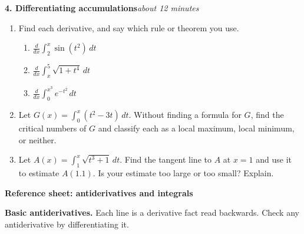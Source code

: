 \documentclass[11pt]{article}
\newcommand{\prob}[2]{\medskip\noindent\textbf{\large #1}\hfill\textit{#2}\par\smallskip}
\begin{document}
\prob{4. Differentiating accumulations}{about 12 minutes}

\begin{enumerate}
\item Find each derivative, and say which rule or theorem you use.
\begin{enumerate}
\item $\displaystyle\frac{d}{dx}\int_2^x\sin(t^2)\,dt$
\item $\displaystyle\frac{d}{dx}\int_x^5\sqrt{1+t^4}\,dt$
\item $\displaystyle\frac{d}{dx}\int_0^{x^3}e^{-t^2}\,dt$
\end{enumerate}
\item Let $G(x)=\int_0^x(t^2-3t)\,dt$. Without finding a formula for $G$, find the critical
numbers of $G$ and classify each as a local maximum, local minimum, or neither.
\item Let $A(x)=\int_1^x\sqrt{t^3+1}\,dt$. Find the tangent line to $A$ at $x=1$ and use it to
estimate $A(1.1)$. Is your estimate too large or too small? Explain.
\end{enumerate}

\newpage
\begin{center}
{\Large\bfseries Reference sheet: antiderivatives and integrals}\\[4pt]
\end{center}

\noindent\textbf{Basic antiderivatives.} Each line is a derivative fact read backwards.
Check any antiderivative by differentiating it.
\end{document}

